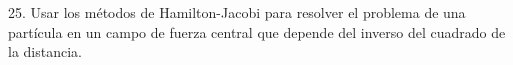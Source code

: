 25. Usar los métodos de Hamilton-Jacobi para resolver el problema de una partícula en un campo de fuerza central que depende del inverso del cuadrado de la distancia.
